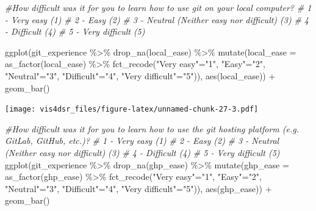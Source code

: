 \documentclass[
]{krantz}
\makeatletter
\newenvironment{Shaded}{\begin{snugshade}}{\end{snugshade}}
\newcommand{\AttributeTok}[1]{\textcolor[rgb]{0.61,0.61,0.61}{#1}}
\newcommand{\CommentTok}[1]{\textcolor[rgb]{0.37,0.37,0.37}{\textit{#1}}}
\newcommand{\FunctionTok}[1]{\textcolor[rgb]{0,0,0}{#1}}
\newcommand{\NormalTok}[1]{#1}
\newcommand{\OtherTok}[1]{\textcolor[rgb]{0.37,0.37,0.37}{#1}}
\newcommand{\SpecialCharTok}[1]{\textcolor[rgb]{0,0,0}{#1}}
\newcommand{\StringTok}[1]{\textcolor[rgb]{0.5,0.5,0.5}{#1}}
\newenvironment{kframe}{%
\medskip{}
\setlength{\fboxsep}{.8em}
 \def\at@end@of@kframe{}%
 \ifinner\ifhmode%
  \def\at@end@of@kframe{\end{minipage}}%
  \begin{minipage}{\columnwidth}%
 \fi\fi%
 \def\FrameCommand##1{\hskip\@totalleftmargin \hskip-\fboxsep
 \colorbox{shadecolor}{##1}\hskip-\fboxsep
     \hskip-\linewidth \hskip-\@totalleftmargin \hskip\columnwidth}%
 \MakeFramed {\advance\hsize-\width
   \@totalleftmargin\z@ \linewidth\hsize
   \@setminipage}}%
 {\par\unskip\endMakeFramed%
 \at@end@of@kframe}
\renewenvironment{Shaded}{\begin{kframe}}{\end{kframe}}
\makeatother
\begin{document}
\begin{Shaded}
\begin{Highlighting}[]
\CommentTok{\#How difficult was it for you to learn how to use git on your local computer?}
\CommentTok{\# 1 {-} Very easy (1)}
\CommentTok{\# 2 {-} Easy (2)}
\CommentTok{\# 3 {-} Neutral (Neither easy nor difficult) (3)}
\CommentTok{\# 4 {-} Difficult (4)}
\CommentTok{\# 5 {-} Very difficult (5)}

\FunctionTok{ggplot}\NormalTok{(git\_experience }\SpecialCharTok{\%\textgreater{}\%} 
         \FunctionTok{drop\_na}\NormalTok{(local\_ease) }\SpecialCharTok{\%\textgreater{}\%}
         \FunctionTok{mutate}\NormalTok{(}\AttributeTok{local\_ease =} \FunctionTok{as\_factor}\NormalTok{(local\_ease) }\SpecialCharTok{\%\textgreater{}\%} 
             \FunctionTok{fct\_recode}\NormalTok{(}\StringTok{"Very easy"}\OtherTok{=}\StringTok{"1"}\NormalTok{, }
                        \StringTok{"Easy"}\OtherTok{=}\StringTok{"2"}\NormalTok{, }\StringTok{"Neutral"}\OtherTok{=}\StringTok{"3"}\NormalTok{, }
                        \StringTok{"Difficult"}\OtherTok{=}\StringTok{"4"}\NormalTok{, }\StringTok{"Very difficult"}\OtherTok{=}\StringTok{"5"}\NormalTok{)), }
       \FunctionTok{aes}\NormalTok{(local\_ease)) }\SpecialCharTok{+}
  \FunctionTok{geom\_bar}\NormalTok{()}
\end{Highlighting}
\end{Shaded}

\texttt{[image: vis4dsr\_files/figure-latex/unnamed-chunk-27-3.pdf]}

\begin{Shaded}
\begin{Highlighting}[]
\CommentTok{\#How difficult was it for you to learn how to use the git hosting platform (e.g. GitLab, GitHub, etc.)?}
\CommentTok{\# 1 {-} Very easy (1)}
\CommentTok{\# 2 {-} Easy (2)}
\CommentTok{\# 3 {-} Neutral (Neither easy nor difficult) (3)}
\CommentTok{\# 4 {-} Difficult (4)}
\CommentTok{\# 5 {-} Very difficult (5)}
\FunctionTok{ggplot}\NormalTok{(git\_experience }\SpecialCharTok{\%\textgreater{}\%} 
         \FunctionTok{drop\_na}\NormalTok{(ghp\_ease) }\SpecialCharTok{\%\textgreater{}\%}
         \FunctionTok{mutate}\NormalTok{(}\AttributeTok{ghp\_ease =} \FunctionTok{as\_factor}\NormalTok{(ghp\_ease) }\SpecialCharTok{\%\textgreater{}\%} 
             \FunctionTok{fct\_recode}\NormalTok{(}\StringTok{"Very easy"}\OtherTok{=}\StringTok{"1"}\NormalTok{, }
                        \StringTok{"Easy"}\OtherTok{=}\StringTok{"2"}\NormalTok{, }\StringTok{"Neutral"}\OtherTok{=}\StringTok{"3"}\NormalTok{, }
                        \StringTok{"Difficult"}\OtherTok{=}\StringTok{"4"}\NormalTok{, }\StringTok{"Very difficult"}\OtherTok{=}\StringTok{"5"}\NormalTok{)), }
       \FunctionTok{aes}\NormalTok{(ghp\_ease)) }\SpecialCharTok{+}
  \FunctionTok{geom\_bar}\NormalTok{()}
\end{Highlighting}
\end{Shaded}
\end{document}
